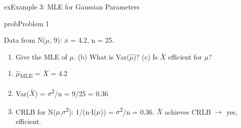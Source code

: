 \begin{PSbox}[unbreakable]{ex}{Example 3: MLE for Gaussian Parameters}
\begin{Shaded}
\begin{Highlighting}[]
\NormalTok{(}\OperatorTok{,} \NormalTok{(}\NormalTok{)}\OperatorTok{,} \OperatorTok{,} \NormalTok{(}\NormalTok{))}\OperatorTok{;}
\NormalTok{(}\OperatorTok{,} \NormalTok{(}\NormalTok{)}\OperatorTok{,} \NormalTok{)}\OperatorTok{;}
\NormalTok{(}\OperatorTok{,} \NormalTok{(}\NormalTok{)}\OperatorTok{,} \NormalTok{)}\OperatorTok{;}
\end{Highlighting}
\end{Shaded}

\end{PSbox}


\begin{PSbox}[unbreakable]{prob}{Problem 1}

Data from N(\ensuremath{\mu}, 9): \ensuremath{\bar{x}} = 4.2, n = 25.

\begin{enumerate}
\def\labelenumi{(\alph{enumi})}
\tightlist
\item
  Give the MLE of \ensuremath{\mu}. (b) What is Var(\ensuremath{\hat{\mu}})? (c) Is \ensuremath{\bar{X}} efficient for \ensuremath{\mu}?
\end{enumerate}

\PSsolution{} 

\begin{enumerate}
\def\labelenumi{(\alph{enumi})}
\tightlist
\item
  \ensuremath{\hat{\mu}}\textsubscript{MLE} = \ensuremath{\bar{X}} = 4.2
\item
  Var(\ensuremath{\bar{X}}) = \ensuremath{\sigma}\textsuperscript{2}/n = 9/25 = 0.36
\item
  CRLB for N(\ensuremath{\mu},\ensuremath{\sigma}\textsuperscript{2}): 1/(n\ensuremath{\cdot}I(\ensuremath{\mu})) = \ensuremath{\sigma}\textsuperscript{2}/n = 0.36. \ensuremath{\bar{X}} achieves CRLB \ensuremath{\to} yes, efficient.
\end{enumerate}

\end{PSbox}

